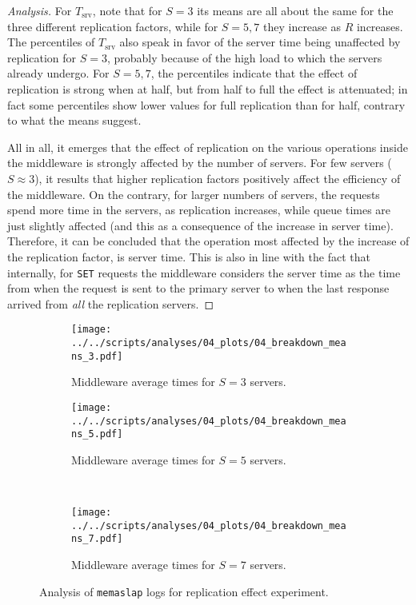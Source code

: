 \documentclass[11pt]{article}
\theoremstyle{definition}
\newenvironment{ana}[1][\proofname]{\begin{proof}[Analysis]}{\end{proof}}
\newcommand\Tsrv{T_{\mathrm{srv}}}
\renewcommand\t\texttt
\begin{document}
\begin{ana}
    For $\Tsrv$, note that for $S=3$ its means are all about the same for the three different replication factors, while for $S=5,7$ they increase as $R$ increases.
    The percentiles of $\Tsrv$ also speak in favor of the server time being unaffected by replication for $S=3$, probably because of the high load to which the servers already undergo.
    For $S=5,7$, the percentiles indicate that the effect of replication is strong when at half, but from half to full the effect is attenuated; in fact some percentiles show lower values for full replication than for half, contrary to what the means suggest.
    
    All in all, it emerges that the effect of replication on the various operations inside the middleware is strongly affected by the number of servers.
    For few servers ($S\approx3$), it results that higher replication factors positively affect the efficiency of the middleware.
    On the contrary, for larger numbers of servers, the requests spend more time in the servers, as replication increases, while queue times are just slightly affected (and this as a consequence of the increase in server time).
    Therefore, it can be concluded that the operation most affected by the increase of the replication factor, is server time.
    This is also in line with the fact that internally, for \t{SET} requests the middleware considers the server time as the time from when the request is sent to the primary server to when the last response arrived from \emph{all} the replication servers.
\end{ana}

\begin{figure}[!h]
    \newcommand\wdt{6.5cm} %
    \centering
    \begin{subfigure}[t]{\wdt}
        \centering
        \texttt{[image: ../../scripts/analyses/04\_plots/04\_breakdown\_means\_3.pdf]}
        \caption{Middleware average times for $S=3$ servers.}\label{fig:04_mw-3}
    \end{subfigure}
    \hspace{0.2cm}
    \begin{subfigure}[t]{\wdt}
        \centering
        \texttt{[image: ../../scripts/analyses/04\_plots/04\_breakdown\_means\_5.pdf]}
        \caption{Middleware average times for $S=5$ servers.}\label{fig:04_mw-5}
    \end{subfigure}
    \\\vspace{3mm}
    \begin{subfigure}[t]{\wdt}
        \centering
        \texttt{[image: ../../scripts/analyses/04\_plots/04\_breakdown\_means\_7.pdf]}
        \caption{Middleware average times for $S=7$ servers.}\label{fig:04_mw-7}
    \end{subfigure}
    \caption{Analysis of \t{memaslap} logs for replication effect experiment.}
    \label{fig:04_mw}
\end{figure}
\end{document}
